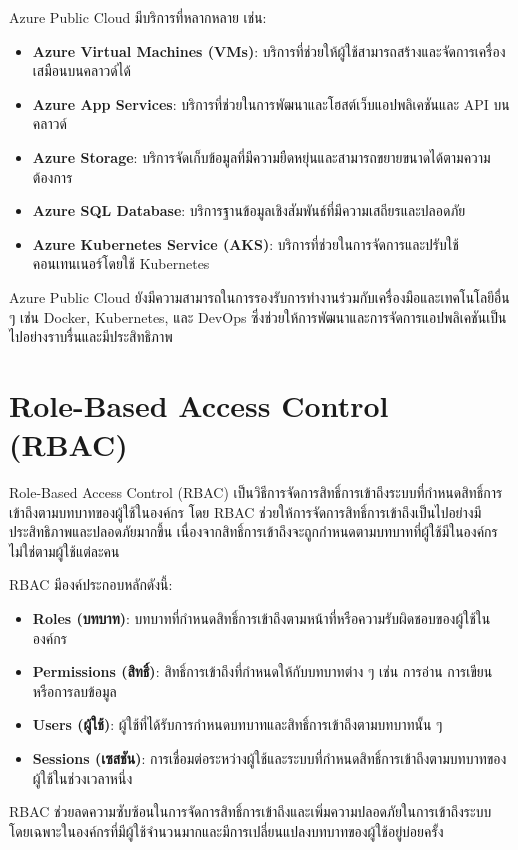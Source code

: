 Azure Public Cloud มีบริการที่หลากหลาย เช่น:
\begin{itemize}
  \item \textbf{Azure Virtual Machines (VMs)}: บริการที่ช่วยให้ผู้ใช้สามารถสร้างและจัดการเครื่องเสมือนบนคลาวด์ได้
  \item \textbf{Azure App Services}: บริการที่ช่วยในการพัฒนาและโฮสต์เว็บแอปพลิเคชันและ API บนคลาวด์
  \item \textbf{Azure Storage}: บริการจัดเก็บข้อมูลที่มีความยืดหยุ่นและสามารถขยายขนาดได้ตามความต้องการ
  \item \textbf{Azure SQL Database}: บริการฐานข้อมูลเชิงสัมพันธ์ที่มีความเสถียรและปลอดภัย
  \item \textbf{Azure Kubernetes Service (AKS)}: บริการที่ช่วยในการจัดการและปรับใช้คอนเทนเนอร์โดยใช้ Kubernetes
\end{itemize}

Azure Public Cloud ยังมีความสามารถในการรองรับการทำงานร่วมกับเครื่องมือและเทคโนโลยีอื่น ๆ เช่น Docker, Kubernetes, และ DevOps ซึ่งช่วยให้การพัฒนาและการจัดการแอปพลิเคชันเป็นไปอย่างราบรื่นและมีประสิทธิภาพ

\section{Role-Based Access Control (RBAC)}
Role-Based Access Control (RBAC) \cite{rbac} เป็นวิธีการจัดการสิทธิ์การเข้าถึงระบบที่กำหนดสิทธิ์การเข้าถึงตามบทบาทของผู้ใช้ในองค์กร โดย RBAC ช่วยให้การจัดการสิทธิ์การเข้าถึงเป็นไปอย่างมีประสิทธิภาพและปลอดภัยมากขึ้น เนื่องจากสิทธิ์การเข้าถึงจะถูกกำหนดตามบทบาทที่ผู้ใช้มีในองค์กร ไม่ใช่ตามผู้ใช้แต่ละคน

RBAC มีองค์ประกอบหลักดังนี้:
\begin{itemize}
  \item \textbf{Roles (บทบาท)}: บทบาทที่กำหนดสิทธิ์การเข้าถึงตามหน้าที่หรือความรับผิดชอบของผู้ใช้ในองค์กร
  \item \textbf{Permissions (สิทธิ์)}: สิทธิ์การเข้าถึงที่กำหนดให้กับบทบาทต่าง ๆ เช่น การอ่าน การเขียน หรือการลบข้อมูล
  \item \textbf{Users (ผู้ใช้)}: ผู้ใช้ที่ได้รับการกำหนดบทบาทและสิทธิ์การเข้าถึงตามบทบาทนั้น ๆ
  \item \textbf{Sessions (เซสชัน)}: การเชื่อมต่อระหว่างผู้ใช้และระบบที่กำหนดสิทธิ์การเข้าถึงตามบทบาทของผู้ใช้ในช่วงเวลาหนึ่ง
\end{itemize}

RBAC ช่วยลดความซับซ้อนในการจัดการสิทธิ์การเข้าถึงและเพิ่มความปลอดภัยในการเข้าถึงระบบ โดยเฉพาะในองค์กรที่มีผู้ใช้จำนวนมากและมีการเปลี่ยนแปลงบทบาทของผู้ใช้อยู่บ่อยครั้ง

